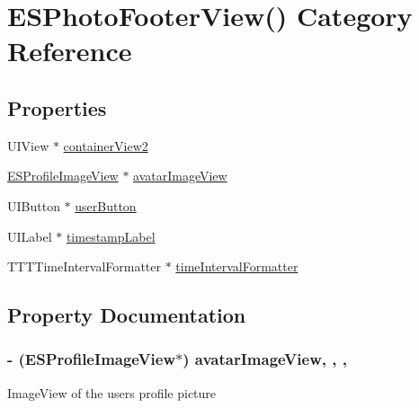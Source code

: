 \hypertarget{category_e_s_photo_footer_view_07_08}{}\section{E\+S\+Photo\+Footer\+View() Category Reference}
\label{category_e_s_photo_footer_view_07_08}
\subsection*{Properties}
\begin{DoxyCompactItemize}
\item 
U\+I\+View $\ast$ \hyperlink{category_e_s_photo_footer_view_07_08_a8b9558c00022f43e0586b65357b01896}{container\+View2}
\item 
\hyperlink{interface_e_s_profile_image_view}{E\+S\+Profile\+Image\+View} $\ast$ \hyperlink{category_e_s_photo_footer_view_07_08_ab023dc5c520ef0d00b7741fb974b7635}{avatar\+Image\+View}
\item 
U\+I\+Button $\ast$ \hyperlink{category_e_s_photo_footer_view_07_08_ae9d068f07ff4b608a3bb09514216307a}{user\+Button}
\item 
U\+I\+Label $\ast$ \hyperlink{category_e_s_photo_footer_view_07_08_a4d72671edc6d9232f5134ed7c4139539}{timestamp\+Label}
\item 
T\+T\+T\+Time\+Interval\+Formatter $\ast$ \hyperlink{category_e_s_photo_footer_view_07_08_a12ad024d232ef01a3eb70c614958935b}{time\+Interval\+Formatter}
\end{DoxyCompactItemize}


\subsection{Property Documentation}
\hypertarget{category_e_s_photo_footer_view_07_08_ab023dc5c520ef0d00b7741fb974b7635}{}
\subsubsection[{avatar\+Image\+View}]{\setlength{\rightskip}{0pt plus 5cm}-\/ ({\bf E\+S\+Profile\+Image\+View}$\ast$) avatar\+Image\+View\hspace{0.3cm}{\ttfamily [read]}, {\ttfamily [write]}, {\ttfamily [nonatomic]}, {\ttfamily [strong]}}\label{category_e_s_photo_footer_view_07_08_ab023dc5c520ef0d00b7741fb974b7635}
Image\+View of the user\textquotesingle{}s profile picture \hypertarget{category_e_s_photo_footer_view_07_08_a8b9558c00022f43e0586b65357b01896}{}
